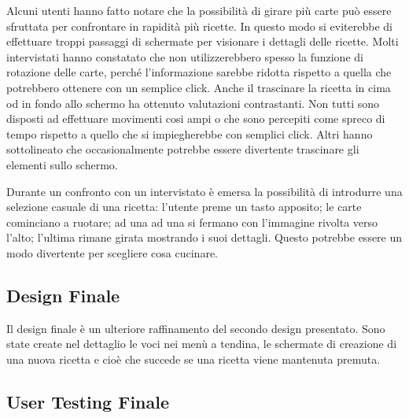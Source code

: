 Alcuni utenti hanno fatto notare che la possibilità di girare più carte può essere sfruttata per confrontare in rapidità più ricette.
In questo modo si eviterebbe di effettuare troppi passaggi di schermate per visionare i dettagli delle ricette.
Molti intervistati hanno constatato che non utilizzerebbero spesso la funzione di rotazione delle carte, perché l'informazione sarebbe ridotta rispetto a quella che potrebbero ottenere con un semplice click.
Anche il trascinare la ricetta in cima od in fondo allo schermo ha ottenuto valutazioni contrastanti.
Non tutti sono disposti ad effettuare movimenti cosi ampi o che sono percepiti come spreco di tempo rispetto a quello che si impiegherebbe con semplici click.
Altri hanno sottolineato che occasionalmente potrebbe essere divertente trascinare gli elementi sullo schermo.

Durante un confronto con un intervistato è emersa la possibilità di introdurre una selezione casuale di una ricetta: l'utente preme un tasto apposito; le carte cominciano a ruotare; ad una ad una si fermano con l'immagine rivolta verso l'alto; l'ultima rimane girata mostrando i suoi dettagli.
Questo potrebbe essere un modo divertente per scegliere cosa cucinare.




\clearpage
\subsection{Design Finale}
Il design finale è un ulteriore raffinamento del secondo design presentato.
Sono state create nel dettaglio le voci nei menù a tendina, le schermate di creazione di una nuova ricetta e cioè che succede se una ricetta viene mantenuta premuta.

\subsection{User Testing Finale}
